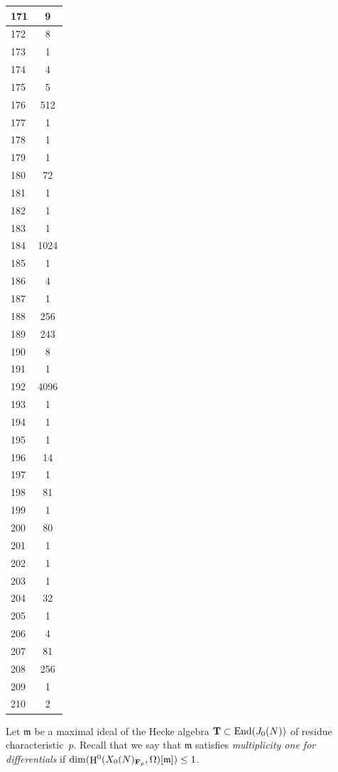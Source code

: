\documentclass[10pt,twoside]{article}
\newcommand{\F}{{\bf{F}}}
\newcommand{\T}{{\bf{T}}}
\newcommand{\m}{{\mathfrak{m}}}
\newcommand{\Fp}{{{\F}_p}}
\newcommand{\End}{{\rm End}}
\renewcommand{\H}{\HHH}
\theoremstyle{definition}
\DeclareMathOperator{\HHH}{H}
\begin{document}
\begin{table}
\begin{center}
\begin{tabular}{|l|c|}
171 & 9 \\\hline
172 & 8 \\\hline
173 & 1 \\\hline
174 & 4 \\\hline
175 & 5 \\\hline
176 & 512 \\\hline
177 & 1 \\\hline
178 & 1 \\\hline
179 & 1 \\\hline
180 & 72 \\\hline
181 & 1 \\\hline
182 & 1 \\\hline
183 & 1 \\\hline
184 & 1024 \\\hline
185 & 1 \\\hline
186 & 4 \\\hline
187 & 1 \\\hline
188 & 256 \\\hline
189 & 243 \\\hline
190 & 8 \\\hline
191 & 1 \\\hline
192 & 4096 \\\hline
193 & 1 \\\hline
194 & 1 \\\hline
195 & 1 \\\hline
196 & 14 \\\hline
197 & 1 \\\hline
198 & 81 \\\hline
199 & 1 \\\hline
200 & 80 \\\hline
201 & 1 \\\hline
202 & 1 \\\hline
203 & 1 \\\hline
204 & 32 \\\hline
205 & 1 \\\hline
206 & 4 \\\hline
207 & 81 \\\hline
208 & 256 \\\hline
209 & 1 \\\hline
210 & 2 \\\hline
\end{tabular}
\end{center}
\end{table}

Let $\m$ be a maximal ideal of the Hecke algebra
$\T\subset\End(J_0(N))$ of residue characteristic~$p$. Recall
that we say that
$\m$ satisfies {\em multiplicity one for differentials} if $\dim
(\H^0(X_0(N)_{\Fp},\Omega)[\m]) \leq 1$.  
\end{document}

